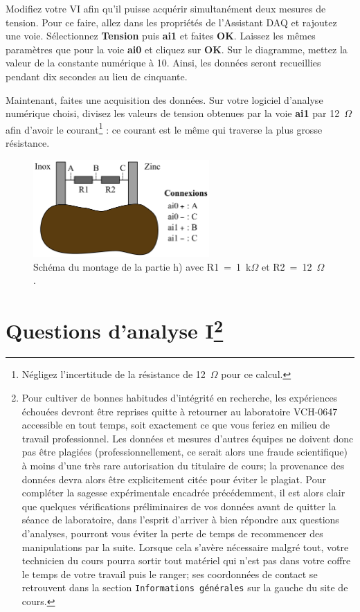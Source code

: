 \documentclass[canadien,12pt,oneside,letterpaper]{article}
\begin{document}
Modifiez votre VI afin qu'il puisse acquérir simultanément deux mesures de tension. Pour ce faire, allez dans les propriétés de l'Assistant DAQ et rajoutez une voie. Sélectionnez \textbf{Tension} puis \textbf{ai1} et faites \textbf{OK}. Laissez les mêmes paramètres que pour la voie \textbf{ai0} et cliquez sur \textbf{OK}. Sur le diagramme, mettez la valeur de la constante numérique à 10. Ainsi, les données seront recueillies pendant dix secondes au lieu de cinquante.

Maintenant, faites une acquisition des données. Sur votre logiciel d'analyse numérique choisi, divisez les valeurs de tension obtenues par la voie \textbf{ai1} par 12~$\Omega$ afin d'avoir le courant\footnote{Négligez l'incertitude de la résistance de 12~$\Omega$ pour ce calcul.} : ce courant est le même qui traverse la plus grosse résistance.

\begin{figure}[h]
\centering
\includegraphics[width=0.6\textwidth]{L1-sch-patate}
\caption{\label{L1-sch-patate}Schéma du montage de la partie h) avec R1~=~1~k$\Omega$ et R2~=~12~$\Omega$.}
\end{figure}

\section[Questions d'analyse I]{Questions d'analyse I\footnote{Pour cultiver de bonnes habitudes d'intégrité en recherche, les expériences échouées devront être reprises quitte à retourner au laboratoire VCH-0647 accessible en tout temps, soit exactement ce que vous feriez en milieu de travail professionnel. Les données et mesures d'autres équipes ne doivent donc pas être plagiées (professionnellement, ce serait alors une fraude scientifique) à moins d'une très rare autorisation du titulaire de cours; la provenance des données devra alors être explicitement citée pour éviter le plagiat. Pour compléter la sagesse expérimentale encadrée précédemment, il est alors clair que quelques vérifications préliminaires de vos données avant de quitter la séance de laboratoire, dans l'esprit d'arriver à bien répondre aux questions d'analyses, pourront vous éviter la perte de temps de recommencer des manipulations par la suite. Lorsque cela s'avère nécessaire malgré tout, votre technicien du cours pourra sortir tout matériel qui n'est pas dans votre coffre le temps de votre travail puis le ranger; ses coordonnées de contact se retrouvent dans la section \texttt{Informations générales} sur la gauche du site de cours.}} \label{sec:grade} 
\end{document}
